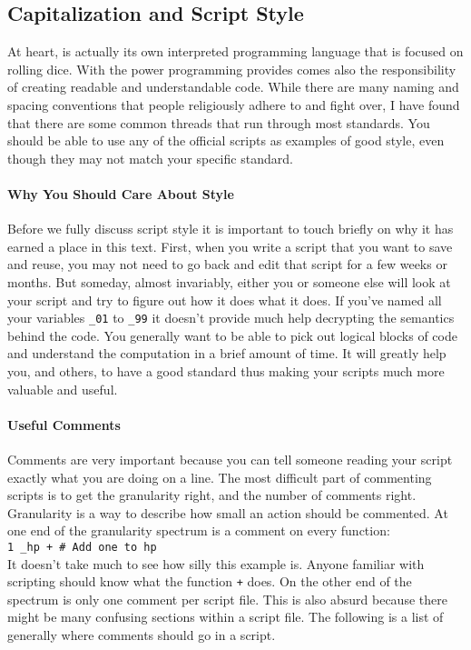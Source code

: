 \subsection{Capitalization and Script Style}
\label{codingStyle}
At heart, \progLogo is actually its own interpreted programming language that
is focused on rolling dice. With the power programming provides comes also
the responsibility of creating readable and understandable code. While there
are many naming and spacing conventions that people religiously adhere to and
fight over, I have found that there are some common threads that run through
most standards. You should be able to use any of the official \progLogo scripts
as examples of good style, even though they may not match your specific
standard.

\paragraph*{Why You Should Care About Style\\}
\hspace*{\parindent}%
Before we fully discuss script style it is important to touch briefly on why it
has earned a place in this text. First, when you write a script that you want
to save and reuse, you may not need to go back and edit that script for a few
weeks or months. But someday, almost invariably, either you or someone else will
look at your script and try to figure out how it does what it does. If you've
named all your variables \texttt{\_01} to \texttt{\_99} it doesn't provide much
help decrypting the semantics behind the code. You generally want to be able
to pick out logical blocks of code and understand the computation in a brief
amount of time. It will greatly help you, and others, to have a good standard
thus making your scripts much more valuable and useful.

\paragraph*{Useful Comments\\}
\hspace*{\parindent}%
Comments are very important because you can tell someone reading your script
exactly what you are doing on a line. The most difficult part of commenting
scripts is to get the granularity right, and the number of comments right.
Granularity is a way to describe how small an action should be commented. At
one end of the granularity spectrum is a comment on every function:\\
\indent\texttt{1 \_hp + \# Add one to hp}\\
It doesn't take much to see how silly this example is. Anyone familiar with
\progLogo scripting should know what the function \texttt{+} does. On the other
end of the spectrum is only one comment per script file. This is also absurd
because there might be many confusing sections within a script file. The
following is a list of generally where comments should go in a script.


